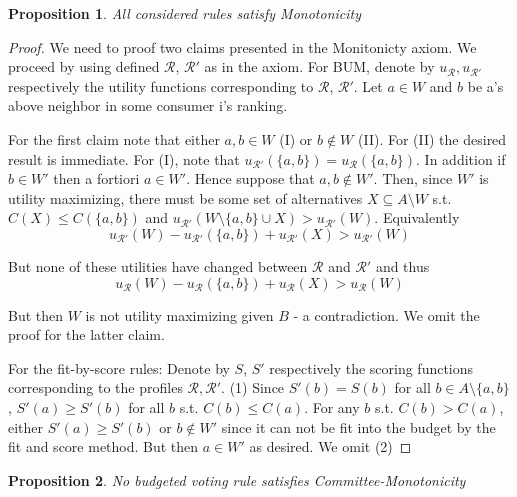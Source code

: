 \documentclass{article}
\newtheorem{mytheorem}{Proposition}
\begin{document}
\begin{mytheorem}
All considered rules satisfy Monotonicity
\end{mytheorem}
\begin{proof}\renewcommand{\qedsymbol}{}
We need to proof two claims presented in the Monitonicty axiom. We proceed by using defined $\mathcal{R}$, $\mathcal{R}'$ as in the axiom. For BUM, denote by $u_\mathcal{R}, u_{\mathcal{R}'}$ respectively the utility functions corresponding to $\mathcal{R}$, $\mathcal{R}'$. Let $a\in W$ and $b$ be a's above neighbor in some consumer i's ranking.

For the first claim note that either $a,b \in W$ (I) or $b\notin W$ (II). For (II) the desired result is immediate. For (I), note that $u_{\mathcal{R}'}(\{a,b\})=u_{\mathcal{R}}(\{a,b\})$. In addition if $b\in W'$ then a fortiori $a\in W'$. Hence suppose that $a,b\notin W'$. Then, since $W'$ is utility maximizing, there must be some set of alternatives $X\subseteq A\setminus W$ s.t. $C(X)\leq C(\{a,b\})$ and $u_{\mathcal{R}'}(W\setminus\{a,b\}\cup X)>u_{\mathcal {R}'}(W)$. Equivalently \[u_{\mathcal{R}'}(W)-u_{\mathcal{R}'}(\{a,b\})+u_{\mathcal{R}'}(X)>u_{\mathcal{R}'}(W)\]

But none of these utilities have changed between $\mathcal{R}$ and ${\mathcal{R}'}$ and thus \[u_\mathcal{R}(W)-u_\mathcal{R}(\{a,b\})+u_\mathcal{R}(X)>u_\mathcal{R}(W)\]

But then $W$ is not utility maximizing given $B$ - a contradiction. We omit the proof for the latter claim.


For the fit-by-score rules: Denote by $S$, $S'$ respectively the scoring functions corresponding to the profiles $\mathcal{R}, \mathcal{R'}$. (1) Since $S'(b)=S(b)$ for all $b\in A\setminus\{a,b\}$, $S'(a)\geq S'(b)$ for all $b$ s.t. $C(b)\leq C(a)$. For any $b$ s.t. $C(b)>C(a)$, either $S'(a)\geq S'(b)$ or $b\notin W'$ since it can not be fit into the budget by the fit and score method. But then $a\in W'$ as desired. We omit (2)
\end{proof}
\begin{mytheorem}
No budgeted voting rule satisfies Committee-Monotonicity
\end{mytheorem}
\end{document}
